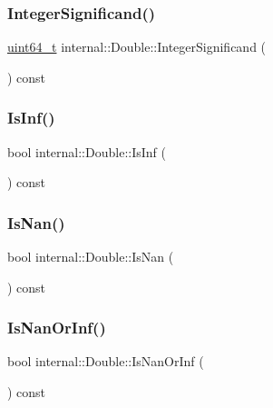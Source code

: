 \subsubsection{\texorpdfstring{Integer\+Significand()}{IntegerSignificand()}}
{\footnotesize\ttfamily \hyperlink{stdint_8h_aec6fcb673ff035718c238c8c9d544c47}{uint64\+\_\+t} internal\+::\+Double\+::\+Integer\+Significand (\begin{DoxyParamCaption}{ }\end{DoxyParamCaption}) const\hspace{0.3cm}{\ttfamily [inline]}}

\mbox{\label{classinternal_1_1Double_afe1ce48f7fb9797e1a2044c58a6b226c}} 
\subsubsection{\texorpdfstring{Is\+Inf()}{IsInf()}}
{\footnotesize\ttfamily bool internal\+::\+Double\+::\+Is\+Inf (\begin{DoxyParamCaption}{ }\end{DoxyParamCaption}) const\hspace{0.3cm}{\ttfamily [inline]}}

\mbox{\label{classinternal_1_1Double_a312312ab2798ee85cbd0e739fcefa386}} 
\subsubsection{\texorpdfstring{Is\+Nan()}{IsNan()}}
{\footnotesize\ttfamily bool internal\+::\+Double\+::\+Is\+Nan (\begin{DoxyParamCaption}{ }\end{DoxyParamCaption}) const\hspace{0.3cm}{\ttfamily [inline]}}

\mbox{\label{classinternal_1_1Double_a8b9a82e8b99783b7e98b5307756021c0}} 
\subsubsection{\texorpdfstring{Is\+Nan\+Or\+Inf()}{IsNanOrInf()}}
{\footnotesize\ttfamily bool internal\+::\+Double\+::\+Is\+Nan\+Or\+Inf (\begin{DoxyParamCaption}{ }\end{DoxyParamCaption}) const\hspace{0.3cm}{\ttfamily [inline]}}

